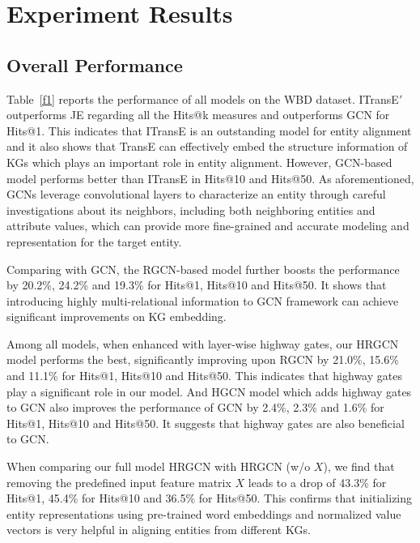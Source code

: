 


	\section{Experiment Results}
	
	
	\subsection{Overall Performance}
    Table~\ref{f1} reports the performance of all models on the WBD dataset. ITransE$'$ outperforms JE regarding all the Hits@k measures and outperforms GCN for Hits@1. This indicates that ITransE is an
outstanding model for entity alignment and it also shows that TransE can effectively embed the structure information of KGs which plays an
important role in entity alignment. However, GCN-based model performs better than ITransE in Hits@10 and Hits@50. As aforementioned, GCNs
leverage convolutional layers to characterize an entity through careful investigations about its neighbors, including both neighboring
entities and attribute values, which can provide more fine-grained and accurate modeling and representation for the target entity.


	Comparing with GCN, the RGCN-based model further boosts the performance by 20.2\%, 24.2\% and 19.3\% for Hits@1, Hits@10 and Hits@50. It shows that introducing highly multi-relational information to GCN framework can achieve significant improvements on KG embedding.
	
	Among all models, when enhanced with layer-wise highway gates, our HRGCN model performs the best, significantly improving upon RGCN by 21.0\%, 15.6\% and 11.1\% for Hits@1, Hits@10 and Hits@50. This indicates that highway gates play a significant role in our model. And HGCN model which adds highway gates to GCN also improves the performance of GCN by 2.4\%, 2.3\% and 1.6\% for Hits@1, Hits@10 and Hits@50. It suggests that highway gates are also beneficial to GCN. 
	
	When comparing our full model HRGCN with HRGCN (w/o $X$), we find that removing the predefined input feature matrix $X$ leads to a drop of 43.3\% for Hits@1, 45.4\% for Hits@10 and 36.5\% for Hits@50. This confirms that initializing entity representations using pre-trained word embeddings and normalized value vectors is very helpful in aligning entities from different KGs.
	
